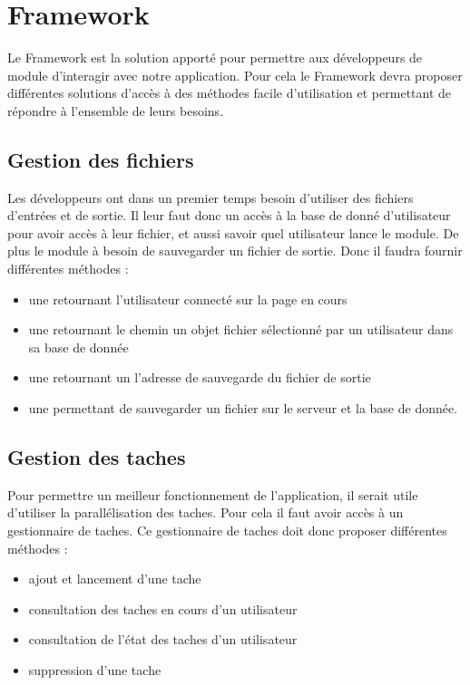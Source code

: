 \section{Framework}

Le Framework est la solution apporté pour permettre aux développeurs de module d'interagir avec notre application. Pour cela le Framework devra proposer différentes solutions d'accès à des méthodes facile d'utilisation et permettant de répondre à l'ensemble de leurs besoins. \\


\subsection{Gestion des fichiers}

Les développeurs ont dans un premier temps besoin d'utiliser des fichiers d'entrées et de sortie. Il leur faut donc un accès à la base de donné d'utilisateur pour avoir accès à leur fichier, et aussi savoir quel utilisateur lance le module. De plus le module à besoin de sauvegarder un fichier de sortie. Donc il faudra fournir différentes méthodes :\\
\begin{itemize}
\item une retournant l'utilisateur connecté sur la page en cours
\item une retournant le chemin un objet fichier sélectionné par un utilisateur dans sa base de donnée
\item une retournant un l'adresse de sauvegarde du fichier de sortie
\item une permettant de sauvegarder un fichier sur le serveur et la base de donnée.
\end{itemize}

\subsection{Gestion des taches}

Pour permettre un meilleur fonctionnement de l'application, il serait utile d'utiliser la parallélisation des taches. Pour cela il faut avoir accès à un gestionnaire de taches. Ce gestionnaire de taches doit donc proposer différentes méthodes : \\
\begin{itemize}
\item ajout et lancement d'une tache
\item consultation des taches en cours d'un utilisateur
\item consultation de l'état des taches d'un utilisateur
\item suppression d'une tache
\end{itemize}